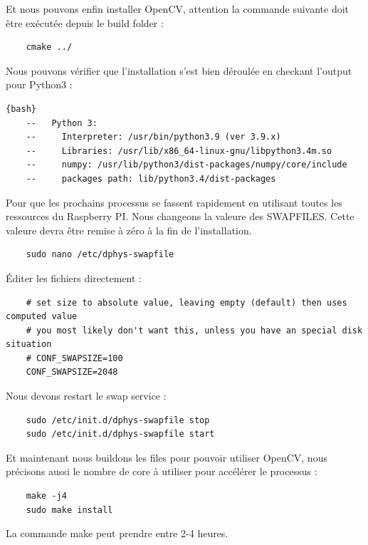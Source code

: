 \documentclass[
	a4paper,									%
	11pt,										%
	twoside,									%
	openright,									%
	notitlepage,									%
	parskip=half,								%
]{scrreprt}										%
\begin{document}
Et nous pouvons enfin installer OpenCV, attention la commande suivante doit être exécutée depuis le build folder :

\begin{verbatim}
	cmake ../
\end{verbatim}

Nous pouvons vérifier que l'installation s'est bien déroulée en checkant l'output pour Python3 : 

\begin{lstlisting}{bash}
	--   Python 3:
	--     Interpreter: /usr/bin/python3.9 (ver 3.9.x)
	--     Libraries: /usr/lib/x86_64-linux-gnu/libpython3.4m.so 
	--     numpy: /usr/lib/python3/dist-packages/numpy/core/include 
	--     packages path: lib/python3.4/dist-packages
\end{lstlisting}

Pour que les prochains processus se fassent rapidement en utilisant toutes les ressources 
du Raspberry PI. Nous changeons la valeure des SWAPFILES. Cette valeure devra être remise à zéro 
à la fin de l'installation.

\begin{verbatim}
	sudo nano /etc/dphys-swapfile
\end{verbatim}

\newpage
Éditer les fichiers directement : 

\begin{verbatim}
	# set size to absolute value, leaving empty (default) then uses computed value
	# you most likely don't want this, unless you have an special disk situation
	# CONF_SWAPSIZE=100
	CONF_SWAPSIZE=2048
\end{verbatim}

Nous devons restart le swap service : 

\begin{verbatim}
	sudo /etc/init.d/dphys-swapfile stop
	sudo /etc/init.d/dphys-swapfile start
\end{verbatim}

Et maintenant nous buildons les files pour pouvoir utiliser OpenCV, nous précisons aussi le nombre de core à utiliser 
pour accélérer le processus : 

\begin{verbatim}
	make -j4
	sudo make install
\end{verbatim}

La commande make peut prendre entre 2-4 heures. \par
\end{document}

